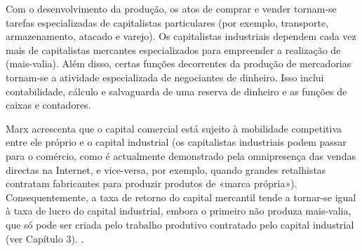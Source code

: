  \par 
Com o desenvolvimento da produção, os atos de comprar e vender tornam-se tarefas especializadas de capitalistas particulares (por exemplo, transporte, armazenamento, atacado e varejo). Os capitalistas industriais dependem cada vez mais de capitalistas mercantes especializados para empreender a realização de (mais-valia). Além disso, certas funções decorrentes da produção de mercadorias tornam-se a atividade especializada de negociantes de dinheiro. Isso inclui contabilidade, cálculo e salvaguarda de uma reserva de dinheiro e as funções de caixas e contadores.
 \par 
Marx acrescenta que o capital comercial está sujeito à mobilidade competitiva entre ele próprio e o capital industrial (os capitalistas industriais podem passar para o comércio, como é actualmente demonstrado pela omnipresença das vendas directas na Internet, e vice-versa, por exemplo, quando grandes retalhistas contratam fabricantes para produzir produtos de «marca própria»). Consequentemente, a taxa de retorno do capital mercantil tende a tornar-se igual à taxa de lucro do capital industrial, embora o primeiro não produza mais-valia, que só pode ser criada pelo trabalho produtivo contratado pelo capital industrial (ver Capítulo {\color{blue}3}). .
 \par 
